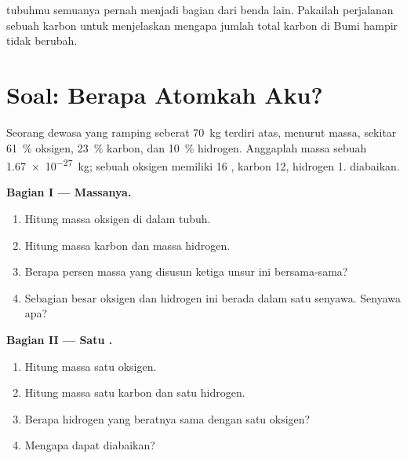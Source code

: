 \begin{exercise}[$\star\star\star$]\label{exo:g9:elements-universe-earth:12}
 tubuhmu semuanya pernah menjadi bagian dari benda lain.
Pakailah perjalanan sebuah  karbon untuk menjelaskan mengapa jumlah
total  karbon di Bumi hampir tidak berubah.
\end{exercise}

\section{Soal: Berapa Atomkah Aku?}

\begin{problem}
\label{pb:g9:elements-universe-earth:1}
Seorang dewasa yang ramping seberat \qty{70}{kg} terdiri atas, menurut
massa, sekitar \qty{61}{\percent} oksigen, \qty{23}{\percent} karbon,
dan \qty{10}{\percent} hidrogen. Anggaplah massa sebuah 
\qty{1.67e-27}{kg}; sebuah  oksigen memiliki 16 ,  karbon
12,  hidrogen 1.  diabaikan.

\medskip
\noindent\textbf{Bagian I --- Massanya.}
\begin{enumerate}
  \item Hitung massa oksigen di dalam tubuh.
  \item Hitung massa karbon dan massa hidrogen.
  \item Berapa persen massa yang disusun ketiga unsur ini bersama-sama?
  \item Sebagian besar oksigen dan hidrogen ini berada dalam satu
        senyawa. Senyawa apa?
\end{enumerate}

\medskip
\noindent\textbf{Bagian II --- Satu .}
\begin{enumerate}[resume]
  \item Hitung massa satu  oksigen.
  \item Hitung massa satu  karbon dan satu  hidrogen.
  \item Berapa  hidrogen yang beratnya sama dengan satu  oksigen?
  \item Mengapa  dapat diabaikan?
\end{enumerate}


\end{problem}

